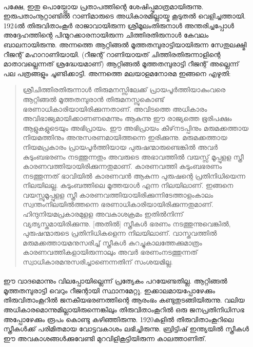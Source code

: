 \paragraph{}പക്ഷേ, ഇതു പൊയ്പ്പോയ പ്രതാപത്തിന്റെ ശേഷിപ്പുമാത്രമായിരുന്നു. ഇരുപതാംനൂറ്റാണ്ടിൽ റാണിമാരുടെ അധികാരമില്ലായ്മ കൂടുതൽ വെളിച്ചത്തായി. 1924ൽ തിരുവിതാംകൂർ രാജാവായിരുന്ന ശ്രീമൂലംതിരുനാൾ അന്തരിച്ചപ്പോൾ അദ്ദേഹത്തിന്റെ പിന്മുറക്കാരനായിരുന്ന ചിത്തിരതിരുനാൾ കേവലം ബാലനായിരുന്നു. അന്നത്തെ ആറ്റിങ്ങൽ മൂത്തതമ്പുരാട്ടിയായിരുന്ന സേതുലക്ഷ്മി റീജന്റ് മഹാറാണിയായി. (റീജന്റ് റാണിയായത് ചിത്തിരതിരുന്നാളിന്റെ മാതാവല്ലെന്നത് ശ്രദ്ധേയമാണ്)
ആറ്റിങ്ങൽ മൂത്തതമ്പുരാട്ടി റീജന്റ് അല്ലെന്ന് പല പത്രങ്ങളും ചൂണ്ടിക്കാട്ടി. അന്നത്തെ മലയാളമനോരമ ഇങ്ങനെ എഴുതി:
\begin{quotation}
\noindent ശ്രീചിത്തിരതിരുന്നാൾ തിരുമനസ്സിലേക്ക് പ്രായപൂർത്തിയാകുംവരെ ആറ്റിങ്ങൽ മൂത്തതമ്പുരാൻ തിരുമനസ്സുകൊണ്ട് ഭരണാധികാരിയായിരിക്കുന്നതാണ്. അവിടത്തെ അധികാരം അവിഭാജ്യമായിക്കാണണമെന്നും ആകുന്നു ഈ രാജ്യത്തെ ഭൂരിപക്ഷം ആളുകളുടെയും അഭിപ്രായം. ഈ അഭിപ്രായം കീഴ്‌നടപ്പിനും മരുമക്കത്തായ നിയമത്തിനും അനുസരണമായിത്തന്നെ ഇരിക്കുന്നു. മരുമക്കത്തായ നിയമപ്രകാരം പ്രായപൂർത്തിയായ പുരുഷന്മാരുണ്ടെങ്കിൽ അവർ കുടുംബഭരണം നടത്തുന്നതും അവരുടെ അഭാവത്തിൽ വയസ്സ് മൂപ്പുളള സ്ത്രീ കാരണവത്തിയായിരിക്കുന്നതുമാണ്. കാരണവത്തി കുടുംബഭരണം നടത്തുന്നത് ഭാവിയിൽ കാരണവൻ ആകുന്ന പുരുഷന്റെ പ്രതിനിധിയെന്ന നിലയിലല്ല. കുടുംബത്തിലെ മൂത്തയാൾ എന്ന നിലയിലാണ്. ഇങ്ങനെ വയസ്സുമൂപ്പുളള സ്ത്രീ കാരണവത്തിയായിരിക്കുന്നിടേത്താളംകാലം സ്വന്തംനിലയിൽത്തന്നെ ഭരണാധികാരിയായിരിക്കുന്നതുമാണ്. ഹിന്ദുനിയമപ്രകാരമുളള അവകാശക്രമം ഇതിൽനിന്ന് വ്യത്യസ്തമായിരിക്കുന്നു. [അതിൽ] സ്ത്രീകൾ ഭരണം നടത്തുന്നുവെങ്കിൽ, പുരുഷന്മാരുടെ പ്രതിനിധികളെന്ന നിലയിലാണ്. വാസ്തവത്തിൽ മരുമക്കത്തായമനുസരിച്ച് സ്ത്രീകൾ കുറച്ചുകാലത്തേക്കുമാത്രം കാരണവത്തികളായിരുന്നാലും അവർ ഭരണംനടത്തുന്നത് സ്വാധികാരമനുസരിച്ചാണെന്നതിന് സംശയമില്ല.
\end{quotation}



\paragraph{}ഈ വാദമൊന്നും വിലപ്പോയില്ലെന്ന് പ്രത്യേകം പറയേണ്ടതില്ല. ആറ്റിങ്ങൽ മൂത്തതമ്പുരാട്ടി വെറും റീജന്റായി സ്ഥാനമേറ്റു. ഇക്കാലമായപ്പോഴേക്കും തിരുവിതാംകൂറിൽ ജനകീയഭരണത്തിന്റെ ആരംഭം കണ്ടുതുടങ്ങിയിരുന്നു. വലിയ അധികാരമൊന്നുമില്ലായിരുന്നെങ്കിലും തിരുവിതാംകൂറിൽ ഒരു ജനപ്രതിനിധിസഭ അപ്പോഴേക്കും രൂപം കൊണ്ടു കഴിഞ്ഞിരുന്നു. 1920കളിൽ തിരുവിതാംകൂറിലെ സ്ത്രീകൾക്ക് പരിമിതമായ വോട്ടവകാശം ലഭിച്ചിരുന്നു. ബ്രിട്ടിഷ് ഇന്ത്യയിൽ സ്ത്രീകൾ ഈ അവകാശങ്ങൾക്കുവേണ്ടി മുറവിളികൂട്ടിയിരുന്ന കാലത്താണിത്.



